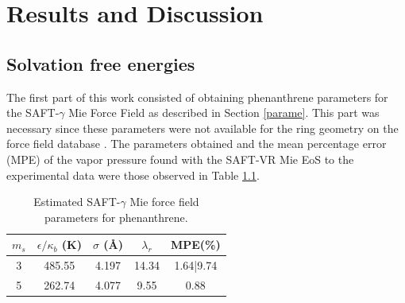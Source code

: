 \chapter{Results and Discussion} %

\label{Chapter5} %

\section{Solvation free energies}

The first part of this work consisted of obtaining phenanthrene parameters for the SAFT-$\gamma$ Mie Force Field as described in Section \ref{parame}. This part was necessary since these parameters were not available for the ring geometry on the force field database \cite{ervik2016}. The parameters obtained and the mean percentage error (MPE) of the vapor pressure found with the SAFT-VR Mie EoS to the experimental data \cite{pvphen} were those observed in Table \ref{tbl:estimparameters}.

\begin{table}[h]
	\centering
	\caption{Estimated SAFT-$\gamma$ Mie force field parameters for phenanthrene.}
	\label{tbl:estimparameters}
	\begin{tabular}{ccccc}
		\hline\hline
		$m_s$                & $\epsilon/\kappa_{b}$ (K) & $\sigma$ (\AA) & $\lambda_r$ & MPE(\%)   \\ \hline\hline
		3 \cite{lafitte2012} & 485.55               & 4.197              & 14.34       & 1.64|9.74 \\
		5  \cite{muller2017} & 262.74               & 4.077              & 9.55        & 0.88      \\ \hline\hline
	\end{tabular}
	
\end{table} 


